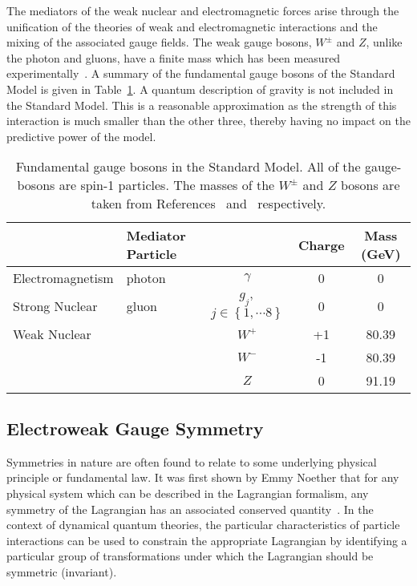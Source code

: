 The mediators of the weak nuclear and electromagnetic forces arise through 
the unification of the theories of weak and electromagnetic interactions and the mixing
of the associated gauge fields. 
The weak gauge bosons, $W^{\pm}$ and $Z$, unlike the photon and gluons, 
have a finite mass which has been measured experimentally~\citep{combinedWmass,pdg}.
A summary of the fundamental gauge bosons of the Standard Model is given in 
Table~\ref{tab:bosons}. A quantum description of gravity is not included in the Standard Model.
This is a reasonable approximation as the strength of this interaction 
is much smaller than the other three, thereby having no impact on the predictive power of the model.
\begin{table}[htbp!]
\begin{tabular}{|l|l c|c|c|}
\hline 
	& \textbf{Mediator Particle} & & \textbf{Charge} & \textbf{Mass (GeV)} \\
\hline
Electromagnetism & photon & $\gamma$ 			& 0 & 0   \\
\hline
Strong Nuclear   & gluon  & $g_{j},$ $j\in\left\{1,\cdots8\right\}$ 	& 0 & 0   \\
\hline
Weak Nuclear 	 &  &  $W^{+}$ & +1 & 80.39 \\
	 	 &  &  $W^{-}$ & -1 & 80.39 \\
	 	 &  &  $Z$     & 0  & 91.19 \\
\hline
\end{tabular}
\caption{Fundamental gauge bosons in the Standard Model.
All of the gauge-bosons are spin-1 particles.
The masses of the $W^{\pm}$ and $Z$ bosons are taken from 
References~\citep{combinedWmass} and~\citep{pdg} respectively.}
\label{tab:bosons}
\end{table}

\subsection{Electroweak Gauge Symmetry}
\label{sec:ewksymmetry}

Symmetries in nature are often found to relate to some underlying physical principle 
or fundamental law. It was first shown by Emmy Noether 
that for any physical system which can be described in the Lagrangian formalism,
any symmetry of the Lagrangian has an associated conserved quantity~\cite{noether}.
In the context of dynamical quantum theories, the particular characteristics of 
particle interactions can be used to constrain the appropriate Lagrangian 
by identifying a particular group of transformations under which 
the Lagrangian should be symmetric (invariant). 


